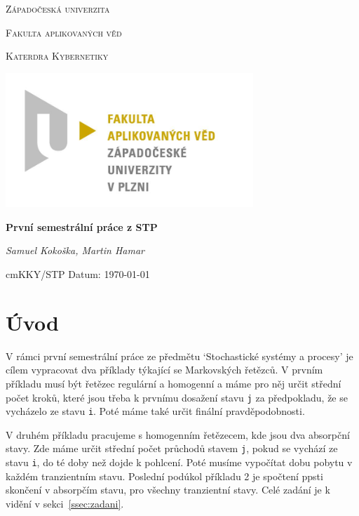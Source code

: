 \documentclass{article}
\begin{document}
\begin{titlepage}

\centering

{\scshape\LARGE Západočeská univerzita\par}
{\scshape\Large Fakulta aplikovaných věd \par}
{\scshape\Large Katerdra Kybernetiky \par}
{\begin{center}
    \includegraphics[width=0.7\textwidth]{pic/fav.jpg} 
\end{center}}

{\huge\bfseries První semestrální práce z STP \par}

\vspace{2cm}

{\Large\itshape Samuel Kokoška, Martin Hamar\par}

\vfill

\vspace{1cm}

 cm{KKY/STP} \hfill {Datum: \today }



\end{titlepage}

\section{Úvod}
V rámci první semestrální práce ze předmětu `Stochastické systémy a procesy' je cílem vypracovat dva příklady týkající se Markovských řetězců.
V prvním příkladu musí být řetězec regulární a homogenní a máme pro něj určit střední počet kroků, které jsou třeba k prvnímu dosažení stavu \verb|j| za předpokladu, že se vycházelo ze stavu \verb|i|. Poté máme také určit finální pravděpodobnosti.

V druhém příkladu pracujeme s homogenním řetězecem, kde jsou dva absorpční stavy. 
Zde máme určit střední počet průchodů stavem \verb|j|, pokud se vychází ze stavu \verb|i|, do té doby než dojde k pohlcení. Poté musíme vypočítat dobu pobytu v každém tranzientním stavu. Poslední podúkol příkladu 2 je spočtení ppsti skončení v absorpčím stavu, pro všechny tranzientní stavy.
Celé zadání je k vidění v sekci~\ref{ssec:zadani}. 
\end{document}

